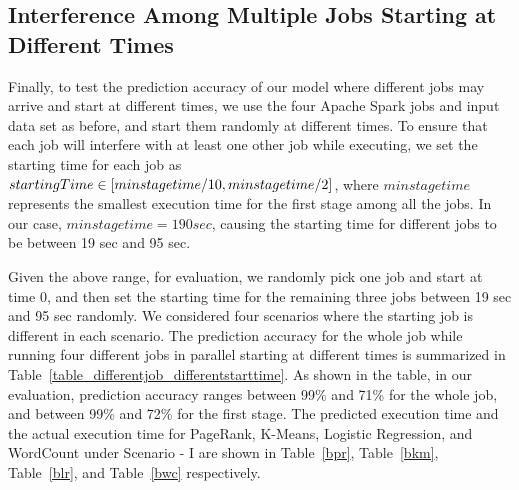 \subsection{Interference Among Multiple Jobs Starting at Different Times}
\label{newsection}
Finally, to test the prediction accuracy of our model where different jobs may arrive and start at different times, we use the four Apache Spark jobs and input data set as before, and start them randomly at different times. To ensure that each job will interfere with at least one other job while executing, we set the starting time for each job as $startingTime \in [minstagetime / 10, \\
minstagetime / 2]$, where $minstagetime$ represents the smallest execution time for the first stage among all the jobs. In our case, $minstagetime=190 sec$, causing the starting time for different jobs to be between 19 sec and 95 sec.

\noindent
Given the above range, for evaluation, we randomly pick one job and start at time 0, and then 
set the starting time for the remaining three jobs between 19 sec and 95 sec randomly. 
We considered four scenarios where the starting job is different in each scenario. The prediction accuracy for the whole job while running four different jobs in parallel starting at different times is summarized in Table~\ref{table_differentjob_differentstarttime}. As shown in the table, in our evaluation, prediction accuracy ranges between 99\% and 71\% for the whole job, and between 99\% and 72\% for the first stage. The predicted execution time and the actual execution time for PageRank, K-Means, Logistic Regression, and WordCount under Scenario - I are shown in Table~\ref{bpr}, Table~\ref{bkm}, Table~\ref{blr}, and Table~\ref{bwc} respectively. 



